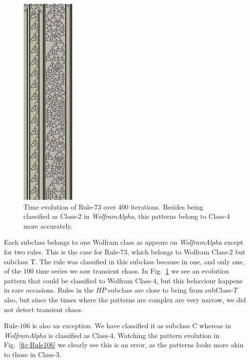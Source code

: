 \begin{figure}
    \centering
    \includegraphics[height=0.95\textheight]{Images/P4/73.png}
    \caption{Time evolution of Rule-$73$ over $400$ iterations. Besides being classified as Class-$2$ in \textit{WolframAlpha}, this patterns belong to Class-$4$ more accurately.}
    \label{fig:Rule73}
\end{figure}





Each subclass belongs to one Wolfram class as appears on \textit{WolframAlpha} except for two rules. This is the case for Rule-$73$, which belongs to Wolfram Class-$2$ but subclass T. The rule was classified in this subclass because in one, and only one, of the $100$ time series we saw transient chaos. In Fig.~\ref{fig:Rule73} we see an evolution pattern that could be classified to Wolfram Class-$4$, but this behaviour happens in rare occasions. Rules in the $HP$ subclass are close to being from subClass-$T$ also, but since the times where the patterns are complex are very narrow, we did not detect transient chaos.

Rule-$106$ is also an exception. We have classified it as subclass C whereas in \textit{WolframAlpha} is classified as Class-$4$. Watching the pattern evolution in Fig.~\ref{fig:Rule106} we clearly see this is an error, as the patterns looks more akin to those in Class-$3$.




